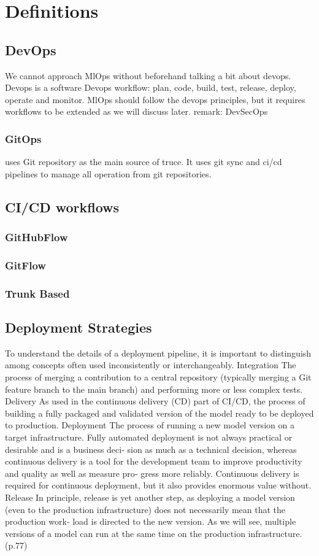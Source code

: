 \section{Definitions}\label{sec:stdefinitions}
\subsection{DevOps}
We cannot approach MlOps without beforehand talking a bit about devops.
Devops is a software
Devops workflow: plan, code, build, test, release, deploy, operate and monitor.
MlOps should follow the devops principles, but it requires workflows to be extended as we will discuss later.
remark: DevSecOps

\subsubsection{GitOps} uses Git repository as the main source of truce.
It uses git sync and ci/cd pipelines to manage all operation from git repositories.
\subsection{CI/CD workflows}
\subsubsection{GitHubFlow}
\subsubsection{GitFlow}
\subsubsection{Trunk Based}
\subsection{Deployment Strategies}

To understand the details of a deployment pipeline, it is important to distinguish
among concepts often used inconsistently or interchangeably.
Integration
The process of merging a contribution to a central repository (typically merging
a Git feature branch to the main branch) and performing more or less complex
tests.
Delivery
As used in the continuous delivery (CD) part of CI/CD, the process of building a
fully packaged and validated version of the model ready to be deployed to
production.
Deployment
The process of running a new model version on a target infrastructure. Fully
automated deployment is not always practical or desirable and is a business deci‐
sion as much as a technical decision, whereas continuous delivery is a tool for the
development team to improve productivity and quality as well as measure pro‐
gress more reliably. Continuous delivery is required for continuous deployment,
but it also provides enormous value without.
Release
In principle, release is yet another step, as deploying a model version (even to the
production infrastructure) does not necessarily mean that the production work‐
load is directed to the new version. As we will see, multiple versions of a model
can run at the same time on the production infrastructure.\cite{treveil2020introducing}(p.77)

